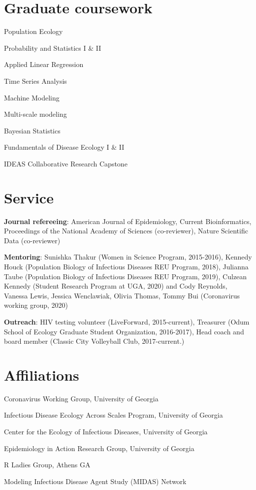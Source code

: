 \documentclass[letterpaper]{article}
\renewenvironment{itemize}{
  \begin{list}{}{
    \setlength{\leftmargin}{1.5em}
  }
}{
  \end{list}
}
\begin{document}
\section*{Graduate coursework}
\begin{multicols}{2}
\begin{itemize}
\item Population Ecology
\item Probability and Statistics I \& II
\item Applied Linear Regression
\item Time Series Analysis 
\item Machine Modeling
\item Multi-scale modeling
\item Bayesian Statistics
\item Fundamentals of Disease Ecology I \& II
\item IDEAS Collaborative Research Capstone 
\end{itemize}
\end{multicols}

\section*{Service}
\begin{itemize}
\item \textbf{Journal refereeing}: American Journal of Epidemiology, Current Bioinformatics, Proceedings of the National Academy of Sciences (co-reviewer), Nature Scientific Data (co-reviewer)
\item \textbf{Mentoring}: Sunishka Thakur (Women in Science Program, 2015-2016), Kennedy Houck (Population Biology of Infectious Diseases REU Program, 2018), Julianna Taube (Population Biology of Infectious Diseases REU Program, 2019), Culzean Kennedy (Student Research Program at UGA, 2020) and Cody Reynolds, Vanessa Lewis, Jessica Wenclawiak, Olivia Thomas, Tommy Bui (Coronavirus working group, 2020)
\item \textbf{Outreach}: HIV testing volunteer (LiveForward, 2015-current),  Treasurer (Odum School of Ecology Graduate Student Organization, 2016-2017), Head coach and board member (Classic City Volleyball Club, 2017-current.) 
\end{itemize}

\section*{Affiliations}
\begin{itemize}
\item Coronavirus Working Group, University of Georgia
\item Infectious Disease Ecology Across Scales Program, University of Georgia  
\item Center for the Ecology of Infectious Diseases, University of Georgia 
\item Epidemiology in Action Research Group, University of Georgia 
\item R Ladies Group, Athens GA 
\item Modeling Infectious Disease Agent Study (MIDAS) Network

\end{itemize}
\end{document}

